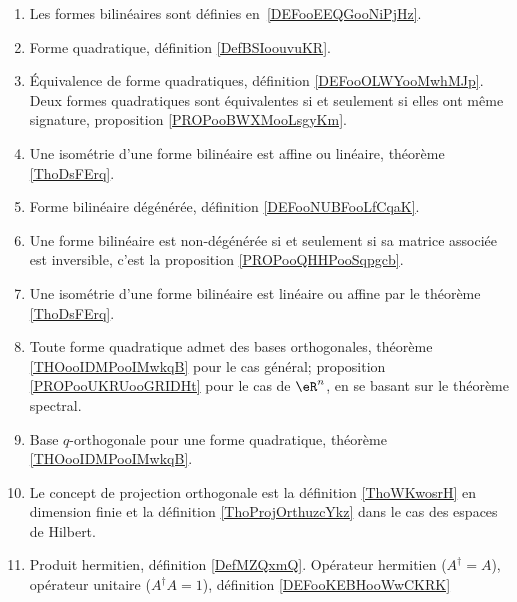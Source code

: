       \label{THEMEooOAJKooEvcCVn}
\begin{enumerate}
	\item
	      Les formes bilinéaires sont définies en~\ref{DEFooEEQGooNiPjHz}.
	\item
	      Forme quadratique, définition \ref{DefBSIoouvuKR}.
	\item
	      Équivalence de forme quadratiques, définition \ref{DEFooOLWYooMwhMJp}. Deux formes quadratiques sont équivalentes si et seulement si elles ont même signature, proposition \ref{PROPooBWXMooLsgyKm}.
	\item
	      Une isométrie d'une forme bilinéaire est affine ou linéaire, théorème \ref{ThoDsFErq}.
	\item
	      Forme bilinéaire dégénérée, définition \ref{DEFooNUBFooLfCqaK}.
	\item
	      Une forme bilinéaire est non-dégénérée si et seulement si sa matrice associée est inversible, c'est la proposition \ref{PROPooQHHPooSqpgcb}.
	\item
	      Une isométrie d'une forme bilinéaire est linéaire ou affine par le théorème \ref{ThoDsFErq}.
	\item
	      Toute forme quadratique admet des bases orthogonales, théorème \ref{THOooIDMPooIMwkqB} pour le cas général; proposition \ref{PROPooUKRUooGRIDHt} pour le cas de \( \eR^n\), en se basant sur le théorème spectral.
	\item
	      Base \( q\)-orthogonale pour une forme quadratique, théorème \ref{THOooIDMPooIMwkqB}.
	\item
	      Le concept de projection orthogonale est la définition \ref{ThoWKwosrH} en dimension finie et la définition \ref{ThoProjOrthuzcYkz} dans le cas des espaces de Hilbert.
	\item
	      Produit hermitien, définition \ref{DefMZQxmQ}. Opérateur hermitien (\( A^{\dag}=A\)), opérateur unitaire (\( A^{\dag}A=1\)), définition \ref{DEFooKEBHooWwCKRK}
\end{enumerate}

